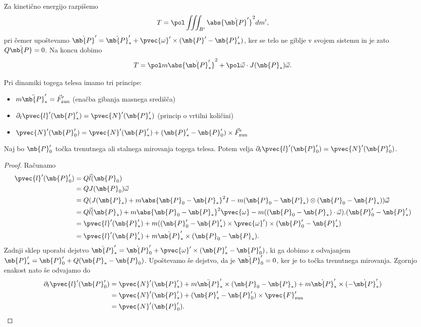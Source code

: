 
Za kinetično energijo razpišemo
\[
  T = \pol \iiint_{B'} \abs{\dot{\mb{P}}'}^2 dm',
\]
pri čemer upoštevamo $\dot{\mb{P}}' = \dot{\mb{P}}_*' + \pvec{\omega}' \times
(\mb{P}' - \mb{P}_*')$, ker se telo ne giblje v svojem sistemu in je zato $Q
\dot{\mb{P}} = 0$.
Na koncu dobimo
\[
  T = \pol m \abs{\dot{\mb{P}}_*'}^2 + \pol \vec{\omega} \cdot J(\mb{P}_*)
  \vec{\omega}.
\]


Pri dinamiki togega telesa imamo tri principe:
\begin{itemize}
\item $m \ddot{\mb{P}}_*' = \vec{F}_{\text{zun}}'$ (enačba gibanja masnega
  središča)
\item $\partial_t \pvec{l}'(\mb{P}_*') = \pvec{N}'(\mb{P}_*')$ (princip o
  vrtilni količini)
\item $\pvec{N}'(\mb{P}_0') = \pvec{N}'(\mb{P}_*') + (\mb{P}_*' - \mb{P}_0')
  \times \vec{F}_{\text{zun}}'$
\end{itemize}

\begin{izrek}
  Naj bo $\mb{P}_0'$ točka trenutnega ali stalnega mirovanja togega telesa.
  Potem velja $\partial_t \pvec{l}'(\mb{P}_0') = \pvec{N}'(\mb{P}_0')$.
\end{izrek}

\begin{proof}
  Računamo
  \begin{align*}
	\pvec{l}'(\mb{P}_0')
	&= Q \vec{l}(\mb{P}_0) \\
	&= Q J(\mb{P}_0) \vec{\omega} \\
	&= Q(J(\mb{P}_*) + m \abs{\mb{P}_0 - \mb{P}_*}^2 I -
	  m (\mb{P}_0 - \mb{P}_*) \otimes (\mb{P}_0 - \mb{P}_*)) \vec{\omega} \\
	&= Q \vec{l}(\mb{P}_*) + m \abs{\mb{P}_0 - \mb{P}_*}^2 \pvec{\omega}
	  - m((\mb{P}_0 - \mb{P}_*) \cdot \vec{\omega}) . (\mb{P}_0' - \mb{P}_*') \\
	&= \pvec{l}'(\mb{P}_*') + m ((\mb{P}_0' - \mb{P}_*') \times \pvec{\omega}')
	  \times (\mb{P}_0' - \mb{P}_*') \\
	&= \pvec{l}'(\mb{P}_*') + m \dot{\mb{P}}_*' \times (\mb{P}_0 - \mb{P}_*).
  \end{align*}
  Zadnji sklep uporabi dejstvo $\dot{\mb{P}}_*' = \dot{\mb{P}}_0' +
  \pvec{\omega}' \times (\mb{P}_*' - \mb{P}_0')$, ki ga dobimo z odvajanjem
  $\mb{P}_*' = \mb{P}_0' + Q(\mb{P}_* - \mb{P}_0)$.
  Upoštevamo še dejstvo, da je $\dot{\mb{P}}_0' = 0$, ker je to točka trenutnega
  mirovanja.
  Zgornjo enakost nato še odvajamo do
  \begin{align*}
	\partial_t \pvec{l}'(\mb{P}_0')
	&= \pvec{N}'(\mb{P}_*') + m \ddot{\mb{P}}_*' \times (\mb{P}_0 - \mb{P}_*)
	  + m \dot{\mb{P}}_*' \times (- \dot{\mb{P}}_*') \\
	&= \pvec{N}'(\mb{P}_*') + (\mb{P}_*' - \mb{P}_0') \times \pvec{F}_{\text{zun}}' \\
	&= \pvec{N}'(\mb{P}_0').
  \end{align*}
\end{proof}

